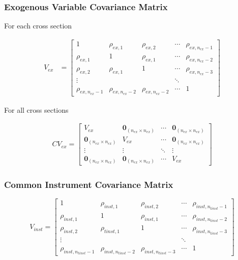 \documentclass[9pt]{beamer}
\begin{document}
\begin{frame} 
\frametitle{ Exogenous Variable Covariance Matrix} 

For each cross section

$$ 
\begin{align*}
V_{ex} &= \begin{bmatrix} 
1 & \rho_{ex,1} & \rho_{ex,2} & \cdots & \rho_{ex,n_{ex}-1} \\[8pt]
\rho_{ex,1} & 1  & \rho_{ex,1} &\cdots & \rho_{ex,n_{ex}-2} \\[8pt]
\rho_{ex,2} & \rho_{ex,1} & 1 & \cdots & \rho_{ex,n_{ex}-3} \\[8pt]
\vdots & &&\ddots&  \\[8pt]
 \rho_{ex,n_{ex}-1} & \rho_{ex,n_{ex}-2} & \rho_{ex,n_{ex}-2} & \cdots &  1 
\end{bmatrix}
\end{align*} 
$$

For all cross sections

$$
\begin{align*}
CV_{ex}  = 
\begin{bmatrix}
V_{ex} & \mathbf{0}_{(n_{ex} \times n_{ex})} & \cdots & \mathbf{0}_{(n_{ex} \times n_{ex})}  \\[8pt]
\mathbf{0}_{(n_{ex} \times n_{ex})} & V_{ex} & \cdots & \mathbf{0}_{(n_{ex} \times n_{ex})}  \\[8pt]
\vdots & \vdots & \ddots & \vdots \\[8pt]
\mathbf{0}_{(n_{ex} \times n_{ex})} & \mathbf{0}_{(n_{ex} \times n_{ex})} & \cdots & V_{ex}
\end{bmatrix} 
\end{align*}
$$

\end{frame}
\begin{frame} 
\frametitle{Common Instrument Covariance Matrix} 

$$
V_{inst} = \begin{bmatrix} 
1 & \rho_{inst,1} & \rho_{inst,2} & \cdots & \rho_{inst,n_{tinst}-1} \\[10pt]
\rho_{inst,1} & 1  & \rho_{inst,1} &\cdots & \rho_{inst,n_{tinst}-2} \\[10pt]
\rho_{inst,2} & \rho_{tinst,1} & 1 & \cdots & \rho_{inst,n_{tinst}-3} \\[10pt]
\vdots & &&\ddots&  \\[10pt]
 \rho_{inst,n_{tinst}-1} & \rho_{inst,n_{tinst}-2} & \rho_{inst,n_{tinst}-3} & \cdots &  1 
\end{bmatrix}
%
$$

\end{frame}
\end{document}
